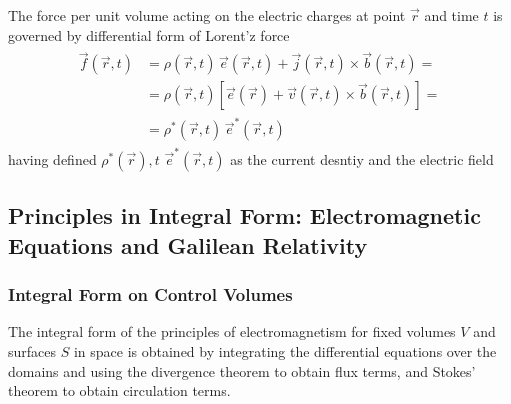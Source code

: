 \documentclass[letterpaper,10pt,english]{jupyterBook}
\begin{document}
\sphinxAtStartPar
{} The force per unit volume acting on the electric charges at point \(\vec{r}\) and time \(t\) is governed by differential form of Lorent’z force
\begin{equation*}
\begin{split}\begin{aligned}
  \vec{f}(\vec{r},t) & = \rho(\vec{r},t) \, \vec{e}(\vec{r},t) + \vec{j}(\vec{r},t) \times \vec{b}(\vec{r},t) = \\
                           & = \rho(\vec{r},t) \left[ \vec{e}(\vec{r}) + \vec{v}(\vec{r},t) \times \vec{b}(\vec{r},t) \right] =  \\
                           & = \rho^*(\vec{r},t) \, \vec{e}^*(\vec{r},t) 
\end{aligned}\end{split}
\end{equation*}
\sphinxAtStartPar
having defined \(\rho^*{(\vec{r}), t}\) \(\vec{e}^*(\vec{r}, t)\) as the current desntiy and the electric field 


\subsection{Principles in Integral Form: Electromagnetic Equations and Galilean Relativity}
\label{\detokenize{ch/principles-vacuum:principles-in-integral-form-electromagnetic-equations-and-galilean-relativity}}\label{\detokenize{ch/principles-vacuum:classical-electromagnetism-principles-integral}}

\subsubsection{Integral Form on Control Volumes}
\label{\detokenize{ch/principles-vacuum:integral-form-on-control-volumes}}\label{\detokenize{ch/principles-vacuum:classical-electromagnetism-principles-integral-control-volume}}
\sphinxAtStartPar
The integral form of the principles of electromagnetism for fixed volumes \(V\) and surfaces \(S\) in space is obtained by integrating the differential equations over the domains and using the divergence theorem to obtain flux terms, and Stokes’ theorem to obtain circulation terms.
\end{document}
